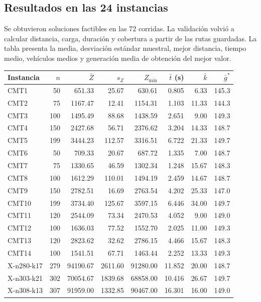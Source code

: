 \clearpage
\subsection{Resultados en las 24 instancias}
Se obtuvieron soluciones factibles en las 72 corridas. La validación volvió a
calcular distancia, carga, duración y cobertura a partir de las rutas guardadas.
La tabla presenta la media, desviación estándar muestral, mejor distancia,
tiempo medio, vehículos medios y generación media de obtención del mejor valor.

\begin{center}\small
\setlength{\tabcolsep}{4pt}
\begin{tabular}{lrrrrrrr}\toprule
Instancia & $n$ & $\bar Z$ & $s_Z$ & $Z_{\min}$ & $\bar t$ (s) & $\bar k$ & $\bar g^*$ \\\midrule
CMT1 & 50 & 651.33 & 25.67 & 630.61 & 0.805 & 6.33 & 145.3 \\
CMT2 & 75 & 1167.47 & 12.41 & 1154.31 & 1.103 & 11.33 & 144.3 \\
CMT3 & 100 & 1495.49 & 88.68 & 1438.59 & 2.651 & 9.00 & 149.3 \\
CMT4 & 150 & 2427.68 & 56.71 & 2376.62 & 3.204 & 14.33 & 148.7 \\
CMT5 & 199 & 3444.23 & 112.57 & 3316.51 & 6.722 & 21.33 & 149.7 \\
CMT6 & 50 & 709.33 & 20.67 & 687.72 & 1.335 & 7.00 & 148.7 \\
CMT7 & 75 & 1330.65 & 46.59 & 1302.34 & 1.248 & 15.67 & 148.3 \\
CMT8 & 100 & 1612.29 & 110.01 & 1494.19 & 2.459 & 14.67 & 148.7 \\
CMT9 & 150 & 2782.51 & 16.69 & 2763.54 & 4.202 & 25.33 & 147.0 \\
CMT10 & 199 & 3734.40 & 125.67 & 3597.15 & 6.446 & 34.00 & 149.7 \\
CMT11 & 120 & 2544.09 & 73.34 & 2470.53 & 4.052 & 9.00 & 149.0 \\
CMT12 & 100 & 1636.03 & 77.52 & 1552.70 & 2.025 & 11.00 & 149.3 \\
CMT13 & 120 & 2823.62 & 32.62 & 2786.15 & 4.466 & 15.67 & 148.3 \\
CMT14 & 100 & 1541.51 & 67.71 & 1463.44 & 2.252 & 13.33 & 149.3 \\
X-n280-k17 & 279 & 94190.67 & 2611.60 & 91280.00 & 11.852 & 20.00 & 148.7 \\
X-n303-k21 & 302 & 70054.67 & 1839.68 & 68858.00 & 10.416 & 26.67 & 149.7 \\
X-n308-k13 & 307 & 91959.00 & 1332.85 & 90467.00 & 16.301 & 16.00 & 149.0 \\

\end{tabular}
\end{center}
